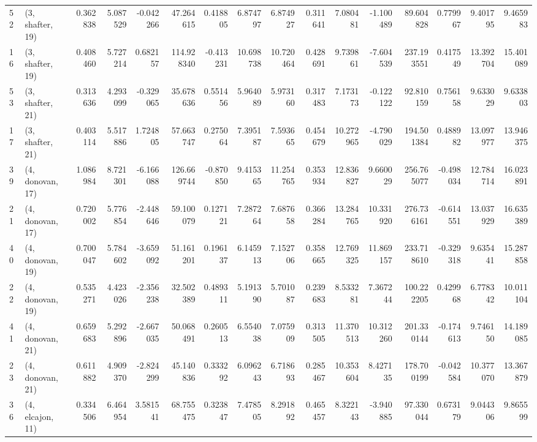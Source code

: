 \begin{tabular}{llrrrrrrrrrrrrrr}
52 &  (3, shafter, 19) &   0.362838 &   5.087529 & -0.042266 &   47.264615 &  0.418805 &   6.874797 &   6.874927 &  0.311641 &   7.080481 &  -1.100489 &   89.604828 &  0.779967 &   9.401795 &   9.465983 \\
16 &  (3, shafter, 19) &   0.408460 &   5.727214 &  0.682157 &  114.928340 & -0.413231 &  10.698738 &  10.720464 &  0.428691 &   9.739861 &  -7.604539 &  237.193551 &  0.417549 &  13.392704 &  15.401089 \\
53 &  (3, shafter, 21) &   0.313636 &   4.293099 & -0.329065 &   35.678636 &  0.551456 &   5.964089 &   5.973160 &  0.317483 &   7.173173 &  -0.122122 &   92.810159 &  0.756158 &   9.633029 &   9.633803 \\
17 &  (3, shafter, 21) &   0.403114 &   5.517886 &  1.724805 &   57.663747 &  0.275064 &   7.395187 &   7.593665 &  0.454679 &  10.272965 &  -4.790029 &  194.501384 &  0.488982 &  13.097977 &  13.946375 \\
39 &  (4, donovan, 17) &   1.086984 &   8.721301 & -6.166088 &  126.669744 & -0.870850 &   9.415365 &  11.254765 &  0.353934 &  12.836827 &   9.660029 &  256.765077 & -0.498034 &  12.784714 &  16.023891 \\
21 &  (4, donovan, 17) &   0.720002 &   5.776854 & -2.448646 &   59.100079 &  0.127121 &   7.287264 &   7.687658 &  0.366284 &  13.284765 &  10.331920 &  276.736161 & -0.614551 &  13.037929 &  16.635389 \\
40 &  (4, donovan, 19) &   0.700047 &   5.784602 & -3.659092 &   51.161201 &  0.196137 &   6.145913 &   7.152706 &  0.358665 &  12.769325 &  11.869157 &  233.718610 & -0.329318 &   9.635441 &  15.287858 \\
22 &  (4, donovan, 19) &   0.535271 &   4.423026 & -2.356238 &   32.502389 &  0.489311 &   5.191390 &   5.701087 &  0.239683 &   8.533281 &   7.367244 &  100.222205 &  0.429968 &   6.778342 &  10.011104 \\
41 &  (4, donovan, 21) &   0.659683 &   5.292896 & -2.667035 &   50.068491 &  0.260513 &   6.554038 &   7.075909 &  0.313505 &  11.370513 &  10.312260 &  201.330144 & -0.174613 &   9.746150 &  14.189085 \\
23 &  (4, donovan, 21) &   0.611882 &   4.909370 & -2.824299 &   45.140836 &  0.333292 &   6.096243 &   6.718693 &  0.285467 &  10.353604 &   8.427135 &  178.700199 & -0.042584 &  10.377070 &  13.367879 \\
36 &  (4, elcajon, 11) &   0.334506 &   6.464954 &  3.581541 &   68.755475 &  0.323847 &   7.478505 &   8.291892 &  0.465457 &   8.322143 &  -3.940885 &   97.330044 &  0.673179 &   9.044306 &   9.865599 \\

\end{tabular}
